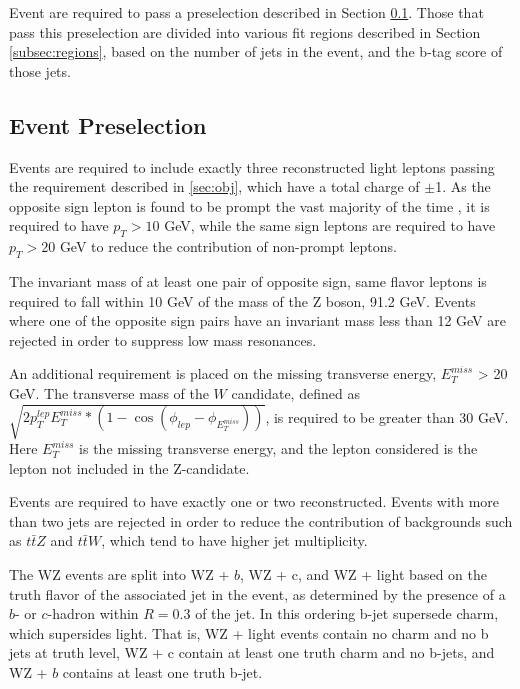 
Event are required to pass a preselection described in Section \ref{subsec:presel}. Those that pass this preselection are divided into various fit regions described in Section \ref{subsec:regions}, based on the number of jets in the event, and the b-tag score of those jets.

\subsection{Event Preselection}
\label{subsec:presel}

Events are required to include exactly three reconstructed light leptons passing the requirement described in \ref{sec:obj}, which have a total charge of $\pm$1. As the opposite sign lepton is found to be prompt the vast majority of the time \cite{ttH_comb}, it is required to have $p_T > 10$ GeV, while the same sign leptons are required to have $p_T > 20$ GeV to reduce the contribution of non-prompt leptons.

The invariant mass of at least one pair of opposite sign, same flavor leptons is required to fall within 10 GeV of the mass of the Z boson, 91.2 GeV. Events where one of the opposite sign pairs have an invariant mass less than 12 GeV are rejected in order to suppress low mass resonances. %

An additional requirement is placed on the missing transverse energy, $E^{miss}_T$ > 20 GeV. The transverse mass of the $W$ candidate, defined as $\sqrt{2p_T^{lep}E^{miss}_T*(1-\cos(\phi_{lep}-\phi_{E^{miss}_T}))}$, is required to be greater than 30 GeV. Here $E^{miss}_T$ is the missing transverse energy, and the lepton considered is the lepton not included in the Z-candidate. 

Events are required to have exactly one or two reconstructed. Events with more than two jets are rejected in order to reduce the contribution of backgrounds such as $t\bar{t}Z$ and $t\bar{t}W$, which tend to have higher jet multiplicity. 

The WZ events are split into WZ + $b$, WZ + c, and WZ + light based on the truth flavor of the associated jet in the event, as determined by the presence of a $b$- or $c$-hadron within $R=0.3$ of the jet. In this ordering b-jet supersede charm, which supersides light. That is, WZ + light events contain no charm and no b jets at truth level, WZ + c contain at least one truth charm and no b-jets, and WZ + $b$ contains at least one truth b-jet. 

